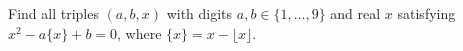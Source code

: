 Find all triples $(a,b,x)$ with digits $a,b\in\{1,\ldots,9\}$ and real $x$ satisfying $x^2-a\{x\}+b=0$, where $\{x\}=x-\lfloor x\rfloor$.
